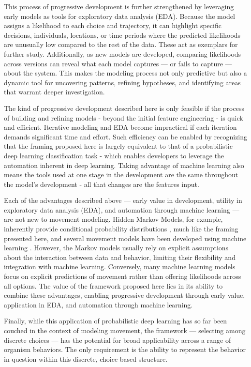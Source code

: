 \documentclass[11pt]{article}
\begin{document}
This process of progressive development is further strengthened by leveraging early models as tools for exploratory data analysis (EDA). Because the model assigns a likelihood to each choice and trajectory, it can highlight specific decisions, individuals, locations, or time periods where the predicted likelihoods are unusually low compared to the rest of the data. These act as exemplars for further study. Additionally, as new models are developed, comparing likelihoods across versions can reveal what each model captures — or fails to capture — about the system. This makes the modeling process not only predictive but also a dynamic tool for uncovering patterns, refining hypotheses, and identifying areas that warrant deeper investigation.

The kind of progressive development described here is only feasible if the process of building and refining models - beyond the initial feature engineering - is quick and efficient. Iterative modeling and EDA become impractical if each iteration demands significant time and effort. Such efficiency can be enabled by recognizing that the framing proposed here is largely equivalent to that of a probabilistic deep learning classification task \citep{durr} - which enables developers to leverage the automation inherent in deep learning. Taking advantage of machine learning also means the tools used at one stage in the development are the same throughout the model's development - all that changes are the features input. 

Each of the advantages described above — early value in development, utility in exploratory data analysis (EDA), and automation through machine learning — are not new to movement modeling. Hidden Markov Models, for example, inherently provide conditional probability distributions \citep{mlmovement1}, much like the framing presented here, and several movement models have been developed using machine learning \citep{mlmovement1}\citep{mlmovement2}\citep{mlmovement3}. However, the Markov models usually rely on explicit assumptions about the interaction between data and behavior, limiting their flexibility and integration with machine learning. Conversely, many machine learning models focus on explicit predictions of movement rather than offering likelihoods across all options. The value of the framework proposed here lies in its ability to combine these advantages, enabling progressive development through early value, application in EDA, and automation through machine learning. 

Finally, while this application of probabilistic deep learning has so far been couched in the context of modeling movement, the framework — selecting among discrete choices — has the potential for broad applicability across a range of organism behaviors. The only requirement is the ability to represent the behavior in question within this discrete, choice-based structure.
\end{document}
